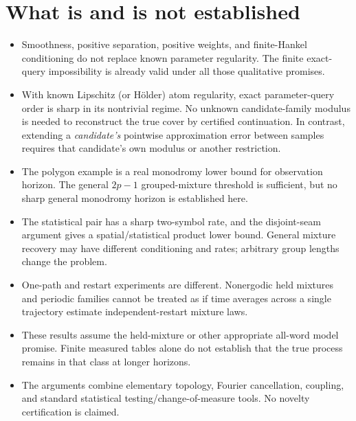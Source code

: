 \documentclass[11pt]{article}
\theoremstyle{remark}\newtheorem{remark}[theorem]{Remark}
\begin{document}
\section{What is and is not established}
\begin{itemize}
\item Smoothness, positive separation, positive weights, and finite-Hankel conditioning do not replace known parameter regularity. The finite exact-query impossibility is already valid under all those qualitative promises.
\item With known Lipschitz (or H\"older) atom regularity, exact parameter-query order is sharp in its nontrivial regime. No unknown candidate-family modulus is needed to reconstruct the true cover by certified continuation. In contrast, extending a \emph{candidate's} pointwise approximation error between samples requires that candidate's own modulus or another restriction.
\item The polygon example is a real monodromy lower bound for observation horizon. The general $2p-1$ grouped-mixture threshold is sufficient, but no sharp general monodromy horizon is established here.
\item The statistical pair has a sharp two-symbol rate, and the disjoint-seam argument gives a spatial/statistical product lower bound. General mixture recovery may have different conditioning and rates; arbitrary group lengths change the problem.
\item One-path and restart experiments are different. Nonergodic held mixtures and periodic families cannot be treated as if time averages across a single trajectory estimate independent-restart mixture laws.
\item These results assume the held-mixture or other appropriate all-word model promise. Finite measured tables alone do not establish that the true process remains in that class at longer horizons.
\item The arguments combine elementary topology, Fourier cancellation, coupling, and standard statistical testing/change-of-measure tools. No novelty certification is claimed.
\end{itemize}
\end{document}
